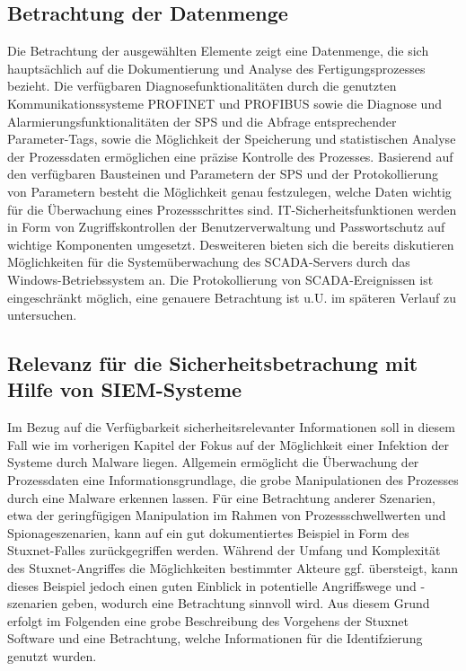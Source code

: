 \subsection{Betrachtung der Datenmenge}
Die Betrachtung der ausgewählten Elemente zeigt eine Datenmenge, die sich hauptsächlich auf die Dokumentierung und Analyse des Fertigungsprozesses bezieht. Die verfügbaren Diagnosefunktionalitäten durch die genutzten Kommunikationssysteme PROFINET und PROFIBUS sowie die Diagnose und Alarmierungsfunktionalitäten der SPS und die Abfrage entsprechender Parameter-Tags, sowie die Möglichkeit der Speicherung und statistischen Analyse der Prozessdaten ermöglichen eine präzise Kontrolle des Prozesses. Basierend auf den verfügbaren Bausteinen und Parametern der SPS und der Protokollierung von Parametern besteht die Möglichkeit genau festzulegen, welche Daten wichtig für die Überwachung eines Prozessschrittes sind. IT-Sicherheitsfunktionen werden in Form von Zugriffskontrollen der Benutzerverwaltung und Passwortschutz auf wichtige Komponenten umgesetzt. Desweiteren bieten sich die bereits diskutieren Möglichkeiten für die Systemüberwachung des SCADA-Servers durch das Windows-Betriebssystem an. Die Protokollierung von SCADA-Ereignissen ist eingeschränkt möglich, eine genauere Betrachtung ist u.U. im späteren Verlauf zu untersuchen.

\subsection{Relevanz für die Sicherheitsbetrachung mit Hilfe von SIEM-Systeme}
Im Bezug auf die Verfügbarkeit sicherheitsrelevanter Informationen soll in diesem Fall wie im vorherigen Kapitel der Fokus auf der Möglichkeit einer Infektion der Systeme durch Malware liegen. Allgemein ermöglicht die Überwachung der Prozessdaten eine Informationsgrundlage, die grobe Manipulationen des Prozesses durch eine Malware erkennen lassen. Für eine Betrachtung anderer Szenarien, etwa der geringfügigen Manipulation im Rahmen von Prozessschwellwerten und Spionageszenarien, kann auf ein gut dokumentiertes Beispiel in Form des Stuxnet-Falles zurückgegriffen werden. Während der Umfang und Komplexität des Stuxnet-Angriffes die Möglichkeiten bestimmter Akteure ggf. übersteigt, kann dieses Beispiel jedoch einen guten Einblick in potentielle Angriffswege und -szenarien geben, wodurch eine Betrachtung sinnvoll wird. Aus diesem Grund erfolgt im Folgenden eine grobe Beschreibung des Vorgehens der Stuxnet Software und eine Betrachtung, welche Informationen für die Identifzierung genutzt wurden.

